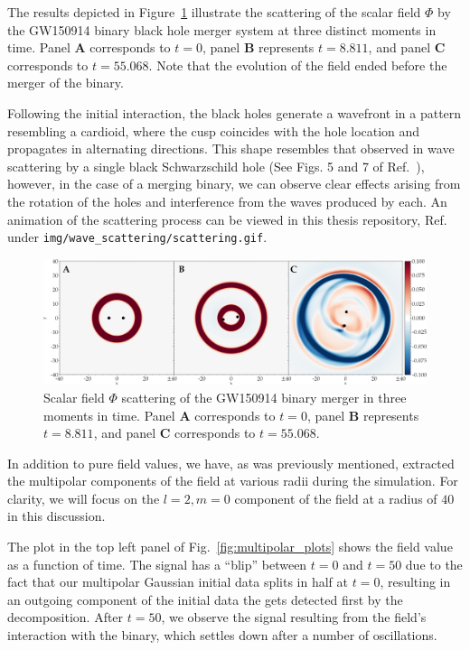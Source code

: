 The results depicted in Figure~\ref{fig:wave_scattering_results} illustrate the scattering of the scalar field $\Phi$ by the GW150914 binary black hole merger system at three distinct moments in time. Panel \textbf{A} corresponds to $t = 0$, panel \textbf{B} represents $t = 8.811$, and panel \textbf{C} corresponds to $t = 55.068$. Note that the evolution of the field ended before the merger of the binary.

Following the initial interaction, the black holes generate a wavefront in a pattern resembling a cardioid, where the cusp coincides with the hole location and propagates in alternating directions. This shape resembles that observed in wave scattering by a single black Schwarzschild hole (See Figs. 5 and 7 of Ref.~\cite{PhysRevD.84.104002}), however, in the case of a merging binary, we can observe clear effects arising from the rotation of the holes and interference from the waves produced by each. An animation of the scattering process can be viewed in this thesis repository, Ref.~\cite{ThesisRepo} under \texttt{img/wave\_scattering/scattering.gif}.

\begin{figure}[h]
  \centering
  \includegraphics[width=\linewidth]{img/wave_scattering/scattering_frames}
  \caption{Scalar field $\Phi$ scattering of the GW150914 binary merger in three moments in time. Panel \textbf{A} corresponds to $t = 0$, panel \textbf{B} represents $t = 8.811$, and panel \textbf{C} corresponds to $t = 55.068$.}
  \label{fig:wave_scattering_results}
\end{figure}

In addition to pure field values, we have, as was previously mentioned, extracted the multipolar components of the field at various radii during the simulation. For clarity, we will focus on the $l=2,m=0$ component of the field at a radius of $40$ in this discussion.

The plot in the top left panel of Fig.~\ref{fig:multipolar_plots} shows the field value as a function of time. The signal has a ``blip'' between $t=0$ and $t=50$ due to the fact that our multipolar Gaussian initial data splits in half at $t=0$, resulting in an outgoing component of the initial data the gets detected first by the decomposition. After $t=50$, we observe the signal resulting from the field's interaction with the binary, which settles down after a number of oscillations.

